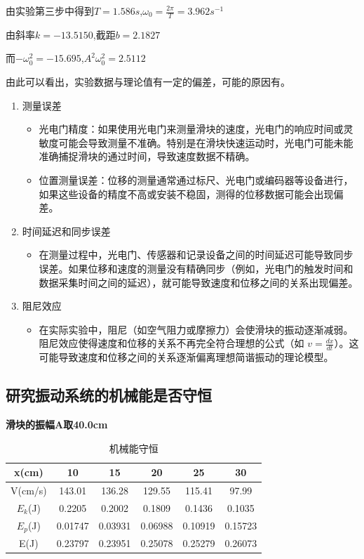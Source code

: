 \documentclass[UTF8]{article}
\theoremstyle{MyLineTheoremStyle} %
\theoremstyle{MyBlockTheoremStyle} %
\theoremstyle{MySubsubsectionStyle} %
\begin{document}
\indent 由实验第三步中得到$T=1.586s$,$\omega_0=\frac{2\pi}{T}=3.962s^{-1}$

\indent 由斜率$k=-13.5150$,截距$b=2.1827$

\indent 而$-\omega_0^2=-15.695$,$A^2\omega_0^2=2.5112$

\indent 由此可以看出，实验数据与理论值有一定的偏差，可能的原因有。\\

\begin{enumerate}
    \item 测量误差
        \begin{itemize}
            \item 光电门精度：如果使用光电门来测量滑块的速度，光电门的响应时间或灵敏度可能会导致测量不准确。特别是在滑块快速运动时，光电门可能未能准确捕捉滑块的通过时间，导致速度数据不精确。
            \item 位置测量误差：位移的测量通常通过标尺、光电门或编码器等设备进行，如果这些设备的精度不高或安装不稳固，测得的位移数据可能会出现偏差。
        \end{itemize}
    \item 时间延迟和同步误差
        \begin{itemize}
            \item 在测量过程中，光电门、传感器和记录设备之间的时间延迟可能导致同步误差。如果位移和速度的测量没有精确同步（例如，光电门的触发时间和数据采集时间之间的延迟），就可能导致速度和位移之间的关系出现偏差。
        \end{itemize}
    \item 阻尼效应
        \begin{itemize}
            \item 在实际实验中，阻尼（如空气阻力或摩擦力）会使滑块的振动逐渐减弱。阻尼效应使得速度和位移的关系不再完全符合理想的公式（如 $v = \frac{dx}{dt}$）。这可能导致速度和位移之间的关系逐渐偏离理想简谐振动的理论模型。
        \end{itemize}
\end{enumerate}


\subsection{研究振动系统的机械能是否守恒}
\textbf{滑块的振幅A取40.0cm}

\begin{table}[H]
    \centering
    \begin{tabular}{|c|c|c|c|c|c|}
        \hline
        x(cm) & 10 & 15 & 20 & 25 & 30\\
        \hline
        V(cm/s) & 143.01 & 136.28 & 129.55 & 115.41 & 97.99\\
        \hline
        $E_k$(J) & 0.2205 & 0.2002 & 0.1809 & 0.1436 & 0.1035\\
        \hline
        $E_p$(J) & 0.01747 & 0.03931 & 0.06988 & 0.10919 & 0.15723\\
        \hline
        E(J) & 0.23797 & 0.23951 & 0.25078 & 0.25279 & 0.26073\\
        \hline			
    \end{tabular}
    \caption{\small 机械能守恒}
\end{table}
\end{document}
